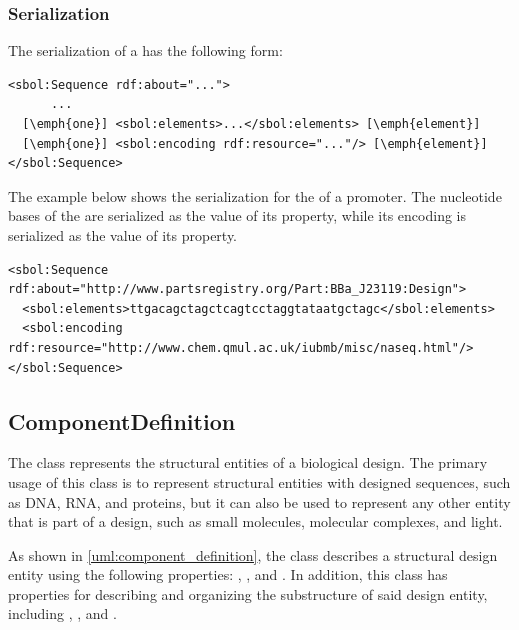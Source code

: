 \subsubsection*{Serialization}
The serialization of a  has the following form:
\begin{lstlisting}
<sbol:Sequence rdf:about="...">
      ...
  [\emph{one}] <sbol:elements>...</sbol:elements> [\emph{element}]
  [\emph{one}] <sbol:encoding rdf:resource="..."/> [\emph{element}]
</sbol:Sequence>
\end{lstlisting}

The example below shows the serialization for the  of a promoter. The nucleotide bases of the  are serialized as the  value of its  property, while its  encoding is serialized as the  value of its   property. 

\begin{lstlisting}
<sbol:Sequence rdf:about="http://www.partsregistry.org/Part:BBa_J23119:Design">
  <sbol:elements>ttgacagctagctcagtcctaggtataatgctagc</sbol:elements>
  <sbol:encoding rdf:resource="http://www.chem.qmul.ac.uk/iubmb/misc/naseq.html"/>
</sbol:Sequence>
\end{lstlisting}


\subsection{ComponentDefinition}
\label{sec:ComponentDefinition}

The  class represents the structural entities of a biological design. The primary usage of this class is to represent structural entities with designed sequences, such as DNA, RNA, and proteins, but it can also be used to represent any other entity that is part of a design, such as small molecules, molecular complexes, and light. 

As shown in \ref{uml:component_definition}, the  class describes a structural design entity using the following properties: , , and . In addition, this class has properties for describing and organizing the substructure of said design entity, including , , and  .

